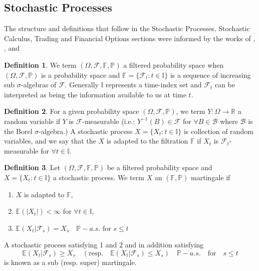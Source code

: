 \documentclass{article}
\theoremstyle{definition}
\newtheorem{definition}{Definition}[section]
\begin{document}
\subsection{Stochastic Processes}
The structure and definitions that follow in the Stochastic Processes, Stochastic Calculus, Trading and Financial Options sections were informed by the works of \cite{mavuso2018order}, \cite{mavuso2019a}, \cite{mavuso2019b} and \cite{mavuso2019c}
\begin{definition}
    We term $(\Omega, \mathcal{F}, \mathbb{F}, \mathbb{P})$ a filtered probability space when $(\Omega, \mathcal{F}, \mathbb{P})$ is a probability space and $\mathbb{F} = \{\mathcal{F}_t : t \in \mathbb{I} \}$ is a sequence of increasing sub $\sigma$-algebras of $\mathcal{F}$. Generally $\mathbb{I}$ represents a time-index set and $\mathcal{F}_t$ can be interpreted as being the information available to us at time $t$.
\end{definition}
\begin{definition}
    For a given probability space $(\Omega, \mathcal{F}, \mathbb{P})$, we term $Y: \Omega \rightarrow \mathbb{R}$ a random variable if $Y$ is $\mathcal{F}$-measurable (i.e.: $Y^{-1}(B) \in \mathcal{F}$ for $\forall B \in \mathcal{B}$ where $\mathcal{B}$ is the Borel $\sigma$-algebra.) A stochastic process $ X= \{X_t: t \in \mathbb{I}\}$ is collection of random variables, and we say that the $X$ is adapted to the filtration $\mathbb{F}$ if $X_t$ is $\mathcal{F}_t$-measurable for $\forall t \in \mathbb{I}$.  
\end{definition}
\begin{definition}
  Let $(\Omega, \mathcal{F}, \mathbb{F}, \mathbb{P})$ be a filtered probability space and $X = \{X_t : t \in \mathbb{I}\}$ a stochastic process. We term $X$ an $(\mathbb{F}, \mathbb{P})$ martingale if 
\begin{enumerate}
    \item $X$ is adapted to $\mathbb{F}$,
    \item $\mathbb{E}(|X_t|) < \infty$ for $\forall t \in \mathbb{I}$,
    \item $\mathbb{E}(X_t| \mathcal{F}_s) = X_s \quad \mathbb{P}-a.s.$ for $s \leq t$
\end{enumerate} 
A stochastic process satisfying 1 and 2 and in addition satisfying $$\mathbb{E}(X_t| \mathcal{F}_s) \geq X_s \quad (\text{resp.}\quad  \mathbb{E}(X_t| \mathcal{F}_s) \leq X_s) \quad \mathbb{P}-a.s. \quad \text{for} \quad s \leq t$$ is known as a sub (resp. super) martingale.
\end{definition}
\end{document}

